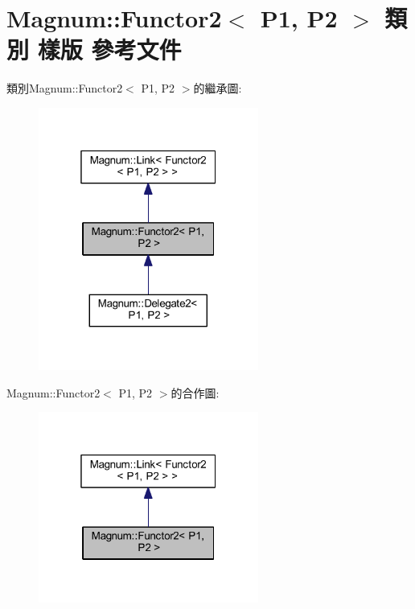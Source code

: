 \hypertarget{class_magnum_1_1_functor2}{}\section{Magnum\+:\+:Functor2$<$ P1, P2 $>$ 類別 樣版 參考文件}
\label{class_magnum_1_1_functor2}


類別\+Magnum\+:\+:Functor2$<$ P1, P2 $>$的繼承圖\+:\nopagebreak
\begin{figure}[H]
\begin{center}
\leavevmode
\includegraphics[width=205pt]{class_magnum_1_1_functor2__inherit__graph}
\end{center}
\end{figure}


Magnum\+:\+:Functor2$<$ P1, P2 $>$的合作圖\+:\nopagebreak
\begin{figure}[H]
\begin{center}
\leavevmode
\includegraphics[width=205pt]{class_magnum_1_1_functor2__coll__graph}
\end{center}
\end{figure}
